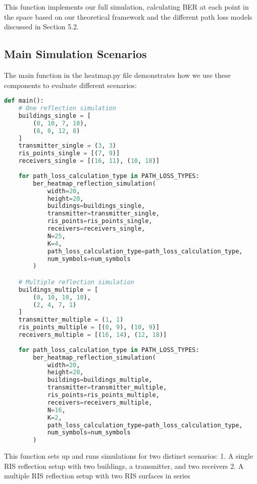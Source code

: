 This function implements our full simulation, calculating BER at each point in the space based on our theoretical framework and the different path loss models discussed in Section 5.2.

\newpage
\subsection{Main Simulation Scenarios}

The main function in the heatmap.py file demonstrates how we use these components to evaluate different scenarios:

\begin{lstlisting}[language=python, caption={Main Simulation Scenarios}]
def main():
    # One reflection simulation
    buildings_single = [
        (0, 10, 7, 10),
        (8, 0, 12, 8)
    ]
    transmitter_single = (3, 3)
    ris_points_single = [(7, 9)]
    receivers_single = [(16, 11), (10, 18)]
    
    for path_loss_calculation_type in PATH_LOSS_TYPES:
        ber_heatmap_reflection_simulation(
            width=20,
            height=20,
            buildings=buildings_single,
            transmitter=transmitter_single,
            ris_points=ris_points_single,
            receivers=receivers_single,
            N=25,
            K=4,
            path_loss_calculation_type=path_loss_calculation_type,
            num_symbols=num_symbols
        )

    # Multiple reflection simulation
    buildings_multiple = [
        (0, 10, 10, 10),
        (2, 4, 7, 1)
    ]
    transmitter_multiple = (1, 1)
    ris_points_multiple = [(0, 9), (10, 9)]
    receivers_multiple = [(16, 14), (12, 18)]
    
    for path_loss_calculation_type in PATH_LOSS_TYPES:
        ber_heatmap_reflection_simulation(
            width=20,
            height=20,
            buildings=buildings_multiple,
            transmitter=transmitter_multiple,
            ris_points=ris_points_multiple,
            receivers=receivers_multiple,
            N=16,
            K=2,
            path_loss_calculation_type=path_loss_calculation_type,
            num_symbols=num_symbols
        )
\end{lstlisting}

This function sets up and runs simulations for two distinct scenarios:
1. A single RIS reflection setup with two buildings, a transmitter, and two receivers
2. A multiple RIS reflection setup with two RIS surfaces in series

